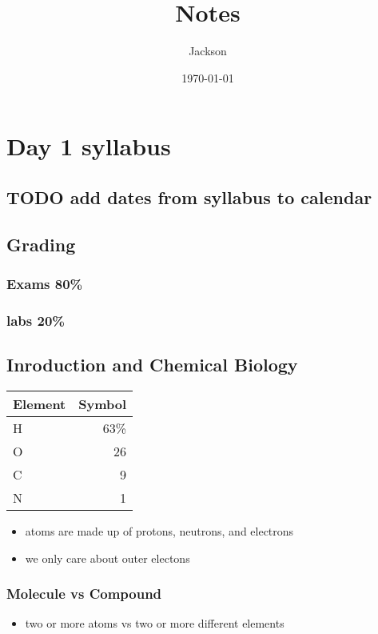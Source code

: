 \documentclass[11pt]{article}
\author{Jackson}
\date{\today}
\title{Notes}
\begin{document}
\maketitle
\tableofcontents


\section{Day 1 syllabus}
\label{sec:org11949e2}
\subsection{{\bfseries\sffamily TODO} add dates from syllabus to calendar}
\label{sec:org0d582dd}
\subsection{Grading}
\label{sec:org3112331}
\subsubsection{Exams 80\%}
\label{sec:org2a687a3}
\subsubsection{labs 20\%}
\label{sec:org47882f6}
\subsection{Inroduction and Chemical Biology}
\label{sec:org9f6c231}
\begin{center}
\begin{tabular}{lr}
Element & Symbol\\
\hline
H & 63\%\\
O & 26\\
C & 9\\
N & 1\\
\end{tabular}
\end{center}
\begin{itemize}
\item atoms are made up of protons, neutrons, and electrons
\item we only care about outer electons
\end{itemize}
\subsubsection{Molecule vs Compound}
\label{sec:org2655de7}
\begin{itemize}
\item two or more atoms vs two or more different elements
\end{itemize}
\end{document}
